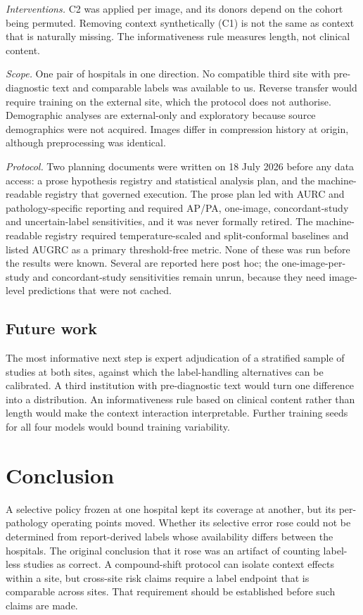 \emph{Interventions.} C2 was applied per image, and its donors depend on the
cohort being permuted. Removing context synthetically (C1) is not the same as
context that is naturally missing. The informativeness rule measures length,
not clinical content.

\emph{Scope.} One pair of hospitals in one direction. No compatible third
site with pre-diagnostic text and comparable labels was available to us.
Reverse transfer would require training on the external site, which the
protocol does not authorise. Demographic analyses are external-only and
exploratory because source demographics were not acquired. Images differ in
compression history at origin, although preprocessing was identical.

\emph{Protocol.} Two planning documents were written on 18 July 2026 before
any data access: a prose hypothesis registry and statistical analysis plan,
and the machine-readable registry that governed execution. The prose plan led
with AURC and pathology-specific reporting and required AP/PA, one-image,
concordant-study and uncertain-label sensitivities, and it was never formally
retired. The machine-readable registry required temperature-scaled and
split-conformal baselines and listed AUGRC as a primary threshold-free metric.
None of these was run before the results were known. Several are reported here
post hoc; the one-image-per-study and concordant-study sensitivities remain
unrun, because they need image-level predictions that were not cached.

\subsection{Future work}
The most informative next step is expert adjudication of a stratified sample
of studies at both sites, against which the label-handling alternatives can be
calibrated. A third institution with pre-diagnostic text would turn one
difference into a distribution. An informativeness rule based on clinical
content rather than length would make the context interaction interpretable.
Further training seeds for all four models would bound training variability.

\section{Conclusion}
A selective policy frozen at one hospital kept its coverage at another, but
its per-pathology operating points moved. Whether its selective error rose
could not be determined from report-derived labels whose availability differs
between the hospitals. The original conclusion that it rose was an artifact
of counting label-less studies as correct. A compound-shift protocol can
isolate context effects within a site, but cross-site risk claims require a
label endpoint that is comparable across sites. That requirement should be
established before such claims are made.
